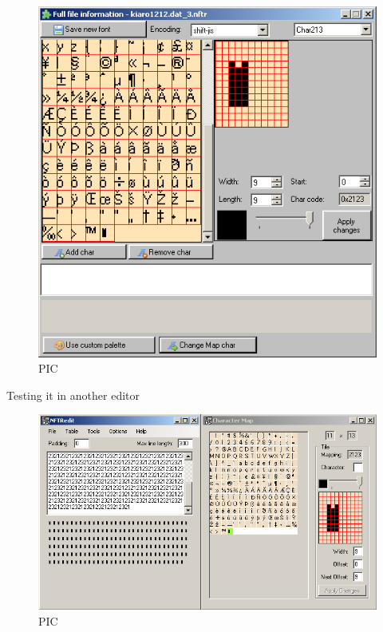\documentclass[
]{book}
\begin{document}
\begin{figure}
\centering
\includegraphics{images/120_home_fast6191_romhackingguide_unrenamed_fil___nal_borders_romhackingguidefontnftradding_4.png}
\caption{PIC}
\end{figure}

Testing it in another editor

\begin{figure}
\centering
\includegraphics{images/121_home_fast6191_romhackingguide_unrenamed_fil___nal_borders_romhackingguidefontnftradding_5.png}
\caption{PIC}
\end{figure}
\end{document}
